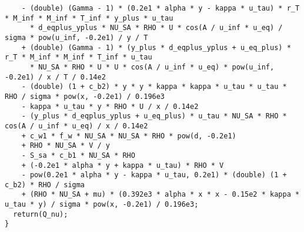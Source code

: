 \documentclass[10pt]{article}
\begin{document}
\begin{footnotesize}
\begin{verbatim}
    - (double) (Gamma - 1) * (0.2e1 * alpha * y - kappa * u_tau) * r_T * M_inf * M_inf * T_inf * y_plus * u_tau 
      * d_eqplus_yplus * NU_SA * RHO * U * cos(A / u_inf * u_eq) / sigma * pow(u_inf, -0.2e1) / y / T 
    + (double) (Gamma - 1) * (y_plus * d_eqplus_yplus + u_eq_plus) * r_T * M_inf * M_inf * T_inf * u_tau 
      * NU_SA * RHO * U * U * cos(A / u_inf * u_eq) * pow(u_inf, -0.2e1) / x / T / 0.14e2 
    - (double) (1 + c_b2) * y * y * kappa * kappa * u_tau * u_tau * RHO / sigma * pow(x, -0.2e1) / 0.196e3 
    - kappa * u_tau * y * RHO * U / x / 0.14e2 
    - (y_plus * d_eqplus_yplus + u_eq_plus) * u_tau * NU_SA * RHO * cos(A / u_inf * u_eq) / x / 0.14e2 
    + c_w1 * f_w * NU_SA * NU_SA * RHO * pow(d, -0.2e1) 
    + RHO * NU_SA * V / y 
    - S_sa * c_b1 * NU_SA * RHO 
    + (-0.2e1 * alpha * y + kappa * u_tau) * RHO * V 
    - pow(0.2e1 * alpha * y - kappa * u_tau, 0.2e1) * (double) (1 + c_b2) * RHO / sigma 
    + (RHO * NU_SA + mu) * (0.392e3 * alpha * x * x - 0.15e2 * kappa * u_tau * y) / sigma * pow(x, -0.2e1) / 0.196e3;
  return(Q_nu);
}
\end{verbatim}
\end{footnotesize}


 


\appendix

%
\end{document}
